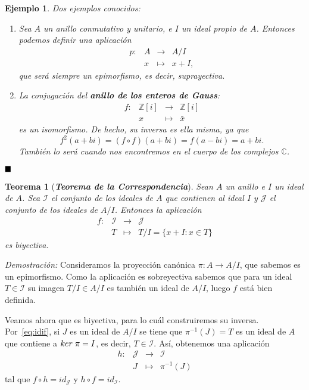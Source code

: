 \documentclass[12pt]{article}
\newtheorem{theorem}{Teorema}[section]
\newtheorem{example}{Ejemplo}[theorem]
\begin{document}
\begin{example} Dos ejemplos conocidos: \begin{enumerate}
\item Sea $A$ un anillo conmutativo y unitario, e $I$ un ideal propio de $A$. Entonces podemos definir una aplicación $$\begin{array}{rccl}
p \colon &A&\longrightarrow &A/I \\
&x& \longmapsto &x + I,
\end{array}
$$ que será siempre un epimorfismo, es decir, suprayectiva.
\item La conjugación del \textbf{anillo de los enteros de Gauss}: $$\begin{array}{rccl}
f \colon &\mathbb{Z}[i]&\longrightarrow &\mathbb{Z}[i] \\
&x& \longmapsto &\bar{x}
\end{array}
$$ es un isomorfismo. De hecho, su inversa es ella misma, ya que $$f^{2}(a+bi)= (f \circ f)(a+bi)= f(a-bi)= a+bi.$$
También lo será cuando nos encontremos en el cuerpo de los complejos $\mathbb{C}$.
\end{enumerate}
\end{example}
$\hfill \blacksquare$

\begin{theorem}[\textbf{\textit{Teorema de la Correspondencia}}]Sean $A$ un anillo e $I$ un ideal de $A$. Sea $\mathcal{I}$ el conjunto de los ideales de $A$ que contienen al ideal $I$ y $\mathcal{J}$ el conjunto de los ideales de $A/I$. Entonces la aplicación $$\begin{array}{rccl}
f \colon &\mathcal{I}&\longrightarrow &\mathcal{J} \\
&T& \longmapsto &T/I = \lbrace x+I : x\in T \rbrace
\end{array}
$$ 
es biyectiva.
\end{theorem}
\emph{Demostración: }Consideramos la proyección canónica $\pi \colon A \longrightarrow A/I$, que sabemos es un epimorfismo. Como la aplicación es sobreyectiva sabemos que para un ideal $T \in \mathcal{I}$ su imagen $T/I \in A/I$ es también un ideal de $A/I$, luego $f$ está bien definida. 

Veamos ahora que es biyectiva, para lo cuál construiremos su inversa. Por~\ref{eq:idif}, si $J$ es un ideal de $A/I$ se tiene que $\pi^{-1}(J)=T$ es un ideal de $A$ que contiene a $ker \hspace{0.1cm} \pi = I$, es decir, $T \in \mathcal{I}$. Así, obtenemos una aplicación 
$$\begin{array}{rccl}
h \colon &\mathcal{J}&\longrightarrow &\mathcal{I} \\
&J& \longmapsto &\pi^{-1}(J)
\end{array}
$$ 
tal que $f \circ h = id_{\mathcal{J}}$ y $h \circ f = id_{\mathcal{I}}$.
\end{document}
